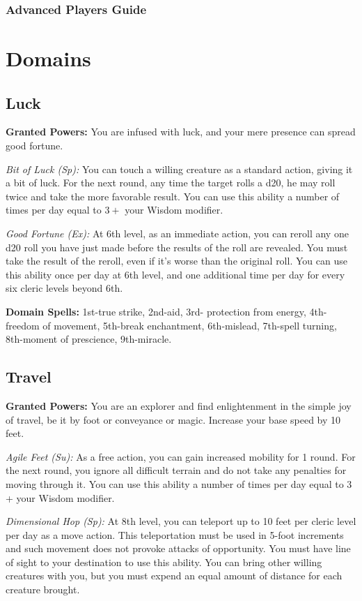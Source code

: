 \documentclass{spelllist}
\begin{document}
  \subsubsection*{Advanced Players Guide}
  
  \section*{Domains}
  \subsection*{Luck}
  \textbf{Granted Powers:} You are infused with luck, and your
mere presence can spread good fortune.

  \emph{Bit of Luck (Sp):} You can touch a willing creature as a
  standard action, giving it a bit of luck. For the next round,
  any time the target rolls a d20, he may roll twice and take
  the more favorable result. You can use this ability a number
  of times per day equal to $3 +$ your Wisdom modifier.
  
  \emph{Good Fortune (Ex):} At 6th level, as an immediate action,
  you can reroll any one d20 roll you have just made before
  the results of the roll are revealed. You must take the result
  of the reroll, even if it’s worse than the original roll. You can
  use this ability once per day at 6th level, and one additional
  time per day for every six cleric levels beyond 6th.
  
  \textbf{Domain Spells:} 1st-true strike, 2nd-aid, 3rd-
  protection from energy, 4th-freedom of movement, 5th-break
  enchantment, 6th-mislead, 7th-spell turning, 8th-moment
  of prescience, 9th-miracle.
  
  \subsection*{Travel}
  \textbf{Granted Powers:} You are an explorer and find
  enlightenment in the simple joy of travel, be it by foot or
  conveyance or magic. Increase your base speed by 10 feet.
  
  \emph{Agile Feet (Su):} As a free action, you can gain increased
  mobility for 1 round. For the next round, you ignore all
  difficult terrain and do not take any penalties for moving
  through it. You can use this ability a number of times per
  day equal to 3 + your Wisdom modifier.
  
  \emph{Dimensional Hop (Sp):} At 8th level, you can teleport up
  to 10 feet per cleric level per day as a move action. This
  teleportation must be used in 5-foot increments and such
  movement does not provoke attacks of opportunity. You
  must have line of sight to your destination to use this
  ability. You can bring other willing creatures with you,
  but you must expend an equal amount of distance for each
  creature brought.
  
\end{document}
